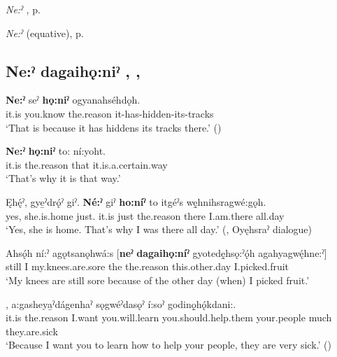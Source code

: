 \begin{CayugaRelated}
\item \textit{Ne:ˀ} , p. \pageref{p:[ne:ˀ] `it is’}\\
\item \textit{Ne:ˀ}  (equative), p. \pageref{p:[ne:ˀ] equative}
\end{CayugaRelated}

\largerpage
\subsection*{\textbf{Ne:ˀ dagaihǫ:niˀ} , , } \label{p:[ne:ˀ dagaihǫ:niˀ]}

\ea
\label{ex:npar42}
\gll \textbf{Ne:ˀ} seˀ \textbf{hǫ:niˀ} ogyanahséhdǫh.\\
it.is you.know the.reason it-has-hidden-its-tracks\\
\glt ‘That is because it has hiddens its tracks there.’ (\cite{mithun_how_1980})
\z

\ea
\label{ex:npar43}
\gll \textbf{Ne:ˀ} \textbf{hǫ:niˀ} to: ní:yoht.\\
it.is the.reason that it.is.a.certain.way\\
\glt ‘That’s why it is that way.’
\z

\ea
\label{ex:npar44}
\gll Ęhę́ˀ, gye̱ˀdrǫ́ˀ giˀ. \textbf{Né:ˀ} giˀ \textbf{ho:níˀ} to itgéˀs wę̱hnihsragwé:gǫh.\\
yes, she.is.home just. it.is just the.reason there I.am.there all.day\\
\glt ‘Yes, she is home. That’s why I was there all day.’ (\cite[456]{mithun_watewayestanih_1984}, Oyęhsraˀ dialogue)
\z

\ea
\label{ex:npar45}
\gll Ahsǫ́h ní:ˀ agǫtsanǫhwá:s [\textbf{neˀ} \textbf{dagaihǫ:níˀ} gyotedę̱hsǫ:ˀǫ́h agahyagwę́hne:ˀ]\\
still I my.knees.are.sore the the.reason this.other.day I.picked.fruit\\
\glt ‘My knees are still sore because of the other day (when) I picked fruit.’
\z

\ea
\label{ex:npar46}
, a:gasheya̱ˀdágenhaˀ sǫgwéˀdasǫˀ í:soˀ godinǫ̱hǫ́kdani:.\\
it.is the.reason I.want you.will.learn you.should.help.them your.people much they.are.sick\\
\glt ‘Because I want you to learn how to help your people, they are very sick.’ (\cite{carrier_legends_2013})
\z

